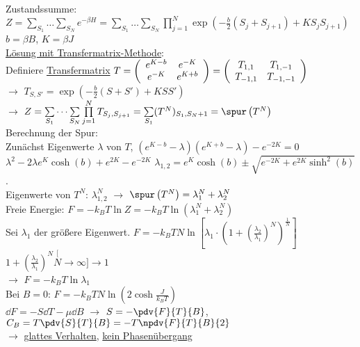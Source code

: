 \begin{tabbing}
Zustandssumme: $Z = \sum\limits_{S_1}\dots\sum\limits_{S_N} e^{-\beta H} = \sum\limits_{S_1} \dots\sum\limits_{S_N}\prod\limits_{j=1}^{N} \exp\left(-\frac{b}{2}(S_j + S_{j+1}) + K S_jS_{j+1}\right)$\\
\> $b = \beta B$, $K = \beta J$\\
\underline{Lösung mit Transfermatrix-Methode}:\\
Definiere \underline{Transfermatrix} $T = \left(\begin{array}{c c} e^{K-b}& e^{-K}\\ e^{-K} & e^{K + b}\end{array}\right) = \left(\begin{array}{c c} T_{1,1} & T_{1,-1}\\ T_{-1,1} & T_{-1,-1}\end{array}\right)$\\
$\rightarrow$\> $T_{S,S'} = \exp \left(-\frac{b}{2} (S + S') + K S S'\right)$\\
$\rightarrow$\> $Z = \sum\limits_{S_1} \dots\sum\limits_{S_N} \prod\limits_{j=1}^{N} T_{S_j,S_{j+1}} = \sum\limits_{S_1} (T^N)_{S_1,S_N+1} = \spur\left(T^N\right)$\\
Berechnung der Spur:\\
\> Zunächst Eigenwerte $\lambda$ von $T$, $(e^{K - b} - \lambda)(e^{K+b} - \lambda) - e^{-2K} = 0$\\
\> $\lambda^2 - 2\lambda e^{K} \cosh (b) + e^{2K} - e^{-2K}$ $\lambda_{1,2} = e^{K} \cosh (b) \pm \sqrt{e^{-2K} + e^{2K}\sinh ^{2}(b)}$.\\
Eigenwerte von $T^N$: $\lambda_{1,2}^N$ $\rightarrow$ $\spur \left(T^N\right) = \lambda_1^N + \lambda_2^N$\\
Freie Energie: $F = -k_B T \ln Z = - k_B T \ln \left(\lambda_1^N + \lambda_2^N\right)$\\
Sei $\lambda_1$ der größere Eigenwert. $F = - k_B T N \ln\left[\lambda_1\cdot\left(1+\left(\frac{\lambda_2}{\lambda_1}\right)^N\right)^{\frac{1}{N}}\right]$\\
\> $1 + \left(\frac{\lambda_2}{\lambda_1}\right)^N \stackrel[N\to\infty]{}{\longrightarrow} 1$\\
$\rightarrow$\> $F = - k_B T \ln \lambda_1$\\
Bei $B = 0$: $F = - k_B T N \ln\left(2 \cosh\frac{J}{k_B T}\right)$\\
$\dd{F} = -S\dd{T} - \mu\dd{B}$ $\rightarrow$ $S = -\pdv{F}{T}{B}$, $C_B= T \pdv{S}{T}{B} = - T \npdv{F}{T}{B}{2}$\\
$\rightarrow$\> \underline{glattes Verhalten}, \underline{kein Phasenübergang}
\end{tabbing}
